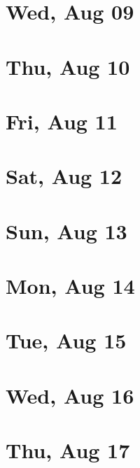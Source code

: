 	\section{Wed, Aug 09}
		
		
	\section{Thu, Aug 10}
		
		
	\section{Fri, Aug 11}
		
		
	\section{Sat, Aug 12}
		
		
	\section{Sun, Aug 13}
		
		
	\section{Mon, Aug 14}
		
		
	\section{Tue, Aug 15}
		
		
	\section{Wed, Aug 16}
		
		
	\section{Thu, Aug 17}
		
		
